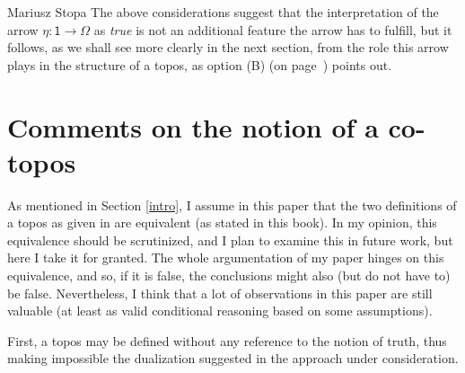 \begin{artengenv}{Mariusz Stopa}
The above considerations suggest that the interpretation of the arrow $ \eta:\textsf{1}\to\Omega $ as \textit{true} is not an additional feature the arrow has to fulfill, but it follows, as we shall see more clearly in the next section, from the role this arrow plays in the structure of a topos, as option (B) (on page~\pageref{opcje}) points out.


\section{Comments on the notion of a co-topos}

As mentioned in Section \ref{intro}, I assume in this paper that the two definitions of a topos as given in \parencite[p.161f and 163]{maclane-moerdijk-1994} are equivalent (as stated in this book). In my opinion, this equivalence should be scrutinized, and I plan to examine this in future work, but here I take it for granted. The whole argumentation of my paper hinges on this equivalence, and so, if it is false, the conclusions might also (but do not have to) be false. Nevertheless, I think that a lot of observations in this paper are still valuable (at least as valid conditional reasoning based on some assumptions).

First, a topos may be defined without any reference to the notion of truth, thus making impossible the dualization suggested in the approach under consideration.



\end{artengenv}
